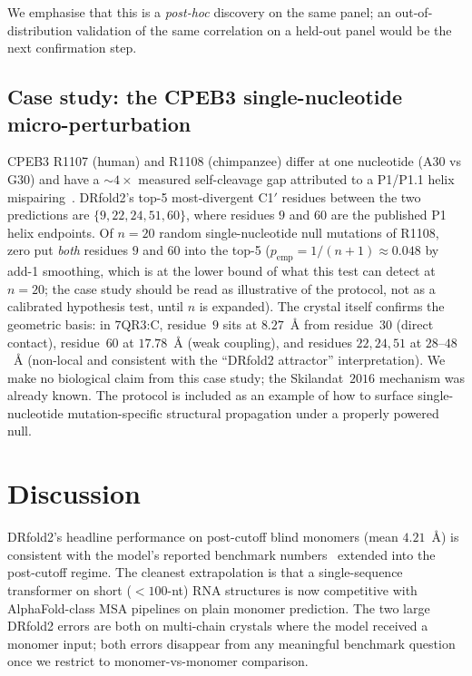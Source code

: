 \documentclass[11pt,a4paper]{article}
\begin{document}
We emphasise that this is a \emph{post-hoc} discovery on the same
panel; an out-of-distribution validation of the same correlation on
a held-out panel would be the next confirmation step.

\subsection{Case study: the CPEB3 single-nucleotide micro-perturbation}
\label{sec:cpeb3}

CPEB3 R1107 (human) and R1108 (chimpanzee) differ at one nucleotide
(A$30$ vs G$30$) and have a $\sim$$4\times$ measured self-cleavage
gap attributed to a P1/P1.1 helix mispairing~\cite{skilandat2016}.
DRfold2's top-5 most-divergent C1$'$ residues between the two
predictions are $\{9, 22, 24, 51, 60\}$, where residues $9$ and $60$
are the published P1 helix endpoints. Of $n=20$ random
single-nucleotide null mutations of R1108, zero put \emph{both}
residues $9$ and $60$ into the top-5
($p_{\mathrm{emp}} = 1/(n+1) \approx 0.048$ by add-1 smoothing,
which is at the lower bound of what this test can detect at
$n=20$; the case study should be read as illustrative of the
protocol, not as a calibrated hypothesis test, until $n$ is
expanded). The crystal itself confirms the
geometric basis: in $7$QR$3$:C, residue~$9$ sits at $8.27$~\AA{}
from residue~$30$ (direct contact), residue~$60$ at $17.78$~\AA{}
(weak coupling), and residues $22, 24, 51$ at $28$--$48$~\AA{}
(non-local and consistent with the ``DRfold2 attractor''
interpretation). We make no biological claim from this case study;
the Skilandat~$2016$ mechanism was already known. The protocol is
included as an example of how to surface single-nucleotide
mutation-specific structural propagation under a properly powered
null.

\section{Discussion}

DRfold2's headline performance on post-cutoff blind monomers
(mean $4.21$~\AA{}) is consistent with the model's reported
benchmark numbers~\cite{drfold2_2025} extended into the
post-cutoff regime. The cleanest extrapolation is that a
single-sequence transformer on short (\textsf{$<$}$100$-nt) RNA
structures is now competitive with AlphaFold-class MSA pipelines on
plain monomer prediction. The two large DRfold2 errors are both
on multi-chain crystals where the model received a monomer input;
both errors disappear from any meaningful benchmark question once we
restrict to monomer-vs-monomer comparison.
\end{document}
